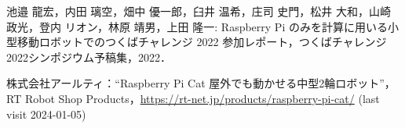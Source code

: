 \documentclass[twocolumn,9pt]{jsproceedings}
\begin{document}
\begin{thebibliography}{99}




  池邉 龍宏，内田 璃空，畑中 優一郎，臼井 温希，庄司 史門，松井 大和，山崎 政光，登内 リオン，林原 靖男，上田 隆一: Raspberry Pi のみを計算に用いる小型移動ロボットでのつくばチャレンジ 2022 参加レポート，つくばチャレンジ2022シンポジウム予稿集，2022．




株式会社アールティ：``Raspberry Pi Cat 屋外でも動かせる中型2輪ロボット''，
RT Robot Shop Products，\url{https://rt-net.jp/products/raspberry-pi-cat/} (last visit 2024-01-05)





\end{thebibliography}
\end{document}
